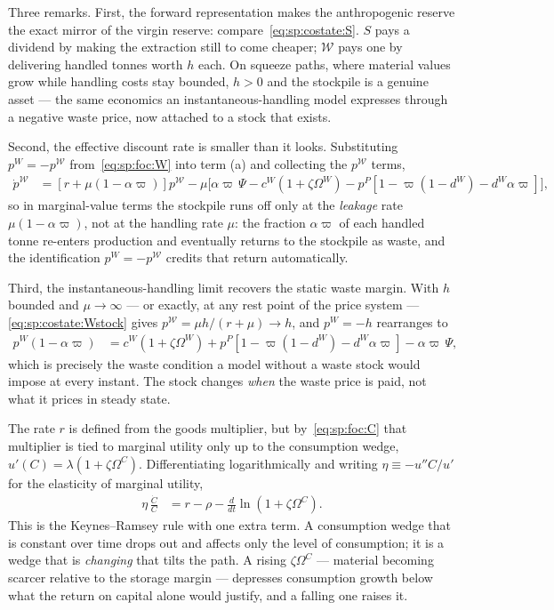 Three remarks. First, the forward representation makes the anthropogenic reserve the exact mirror of the virgin reserve: compare~\eqref{eq:sp:costate:S}. $S$ pays a dividend by making the extraction still to come cheaper; $\mathcal W$ pays one by delivering handled tonnes worth $h$ each. On squeeze paths, where material values grow while handling costs stay bounded, $h>0$ and the stockpile is a genuine asset --- the same economics an instantaneous-handling model expresses through a negative waste price, now attached to a stock that exists.

Second, the effective discount rate is smaller than it looks. Substituting $p^W=-p^{\mathcal W}$ from~\eqref{eq:sp:foc:W} into term (a) and collecting the $p^{\mathcal W}$ terms,
\begin{align}
\dot p^{\mathcal W} &= \left[r+\mu\left(1-\alpha\varpi\right)\right]p^{\mathcal W}
-\mu\Big[\alpha\varpi\,\Psi-c^W\left(1+\zeta\Omega^W\right)-p^P\left[1-\varpi\left(1-d^W\right)-d^W\alpha\varpi\right]\Big],
\label{eq:sp:costate:Wstock-net}
\end{align}
so in marginal-value terms the stockpile runs off only at the \emph{leakage} rate $\mu\left(1-\alpha\varpi\right)$, not at the handling rate $\mu$: the fraction $\alpha\varpi$ of each handled tonne re-enters production and eventually returns to the stockpile as waste, and the identification $p^W=-p^{\mathcal W}$ credits that return automatically.

Third, the instantaneous-handling limit recovers the static waste margin. With $h$ bounded and $\mu\to\infty$ --- or exactly, at any rest point of the price system --- \eqref{eq:sp:costate:Wstock} gives $p^{\mathcal W}=\mu h/\left(r+\mu\right)\to h$, and $p^W=-h$ rearranges to
\begin{align}
p^W\left(1-\alpha\varpi\right) &= c^W\left(1+\zeta\Omega^W\right)+p^P\left[1-\varpi\left(1-d^W\right)-d^W\alpha\varpi\right]-\alpha\varpi\,\Psi ,
\label{eq:sp:costate:Wstock-limit}
\end{align}
which is precisely the waste condition a model without a waste stock would impose at every instant. The stock changes \emph{when} the waste price is paid, not what it prices in steady state.

 The rate $r$ is defined from the goods multiplier, but by~\eqref{eq:sp:foc:C} that multiplier is tied to marginal utility only up to the consumption wedge, $u'\left(C\right)=\lambda\left(1+\zeta\Omega^C\right)$. Differentiating logarithmically and writing $\eta\equiv-u''C/u'$ for the elasticity of marginal utility,
\begin{align}
\eta\,\frac{\dot C}{C} &= r-\rho-\frac{d}{dt}\ln\left(1+\zeta\Omega^C\right).
\label{eq:sp:keynes-ramsey}
\end{align}
This is the Keynes--Ramsey rule with one extra term. A consumption wedge that is constant over time drops out and affects only the level of consumption; it is a wedge that is \emph{changing} that tilts the path. A rising $\zeta\Omega^C$ --- material becoming scarcer relative to the storage margin --- depresses consumption growth below what the return on capital alone would justify, and a falling one raises it.
